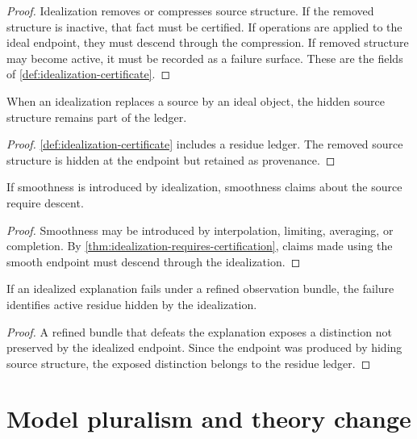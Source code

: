 \begin{proof}
Idealization removes or compresses source structure. If the removed structure is inactive, that fact must be certified. If operations are applied to the ideal endpoint, they must descend through the compression. If removed structure may become active, it must be recorded as a failure surface. These are the fields of \autoref{def:idealization-certificate}.
\end{proof}

\begin{corollary}
\label{cor:idealization-hides-not-deletes}
When an idealization replaces a source by an ideal object, the hidden source structure remains part of the ledger.
\end{corollary}

\begin{proof}
\autoref{def:idealization-certificate} includes a residue ledger. The removed source structure is hidden at the endpoint but retained as provenance.
\end{proof}

\begin{corollary}
\label{cor:smoothness-not-free}
If smoothness is introduced by idealization, smoothness claims about the source require descent.
\end{corollary}

\begin{proof}
Smoothness may be introduced by interpolation, limiting, averaging, or completion. By \autoref{thm:idealization-requires-certification}, claims made using the smooth endpoint must descend through the idealization.
\end{proof}

\begin{theorem}
\label{thm:idealization-failure-localizes-residue}
If an idealized explanation fails under a refined observation bundle, the failure identifies active residue hidden by the idealization.
\end{theorem}

\begin{proof}
A refined bundle that defeats the explanation exposes a distinction not preserved by the idealized endpoint. Since the endpoint was produced by hiding source structure, the exposed distinction belongs to the residue ledger.
\end{proof}

\section{Model pluralism and theory change}
\label{sec:model-pluralism-theory-change}

